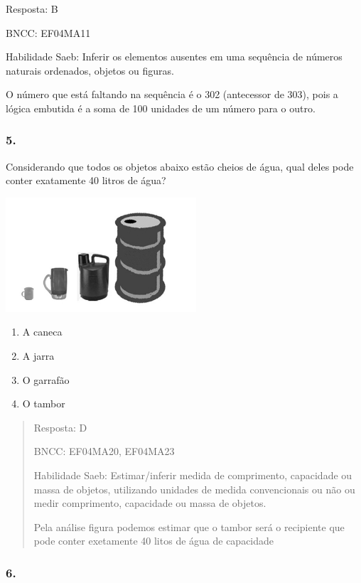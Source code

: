 Resposta: B

BNCC: EF04MA11

Habilidade Saeb: Inferir os elementos ausentes em uma sequência de
números naturais ordenados, objetos ou figuras.

O número que está faltando na sequência é o 302 (antecessor de 303),
pois a lógica embutida é a soma de 100 unidades de um número para o
outro.

\subsubsection{5. }\label{section-191}

Considerando que todos os objetos abaixo estão cheios de água, qual
deles pode conter exatamente 40 litros de água?

\includegraphics[width=2.78846in,height=1.67526in]{media/image166.png}

\begin{enumerate}
\def\labelenumi{\alph{enumi})}
\item
  A caneca
\item
  A jarra
\item
  O garrafão
\item
  O tambor
\end{enumerate}

\begin{quote}
Resposta: D

BNCC: EF04MA20, EF04MA23

Habilidade Saeb: Estimar/inferir medida de comprimento, capacidade ou
massa de objetos, utilizando unidades de medida convencionais ou não ou
medir comprimento, capacidade ou massa de objetos.

Pela análise figura podemos estimar que o tambor será o recipiente que
pode conter exetamente 40 litos de água de capacidade
\end{quote}

\subsubsection{6. }\label{section-192}

